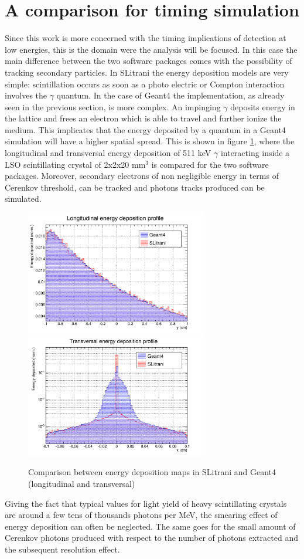 \section{A comparison for timing simulation}
Since this work is more concerned with the timing implications of detection at low energies, this is the domain were the analysis will be focused.
In this case the main difference between the two software packages comes with the possibility of tracking secondary particles.
In SLitrani the energy deposition models are very simple: scintillation occurs as soon as a photo electric or Compton interaction involves the $\gamma$ quantum.
In the case of Geant4 the implementation, as already seen in the previous section, is more complex. An impinging $\gamma$ deposits energy in the lattice and frees an electron which is able to travel and further ionize the medium.
This implicates that the energy deposited by a quantum in a Geant4 simulation will have a higher spatial spread. This is shown in figure \ref{fig:rms}, where the longitudinal and transversal energy deposition of 511 keV $\gamma$ interacting inside a LSO scintillating crystal of 2x2x20 mm$^{3}$ is compared for the two software packages.
Moreover, secondary electrons of non negligible energy in terms of Cerenkov threshold, can be tracked and photons tracks produced can be simulated. 
\begin{figure}[htbp]
\begin{center}
\includegraphics[width=8cm]{../Pictures/Chapter_5/energy_dep.png}
\includegraphics[width=8cm]{../Pictures/Chapter_5/energy_dep_lat.png}
\end{center}
\caption[RMS comparison]{Comparison between energy deposition maps in SLitrani and Geant4 (longitudinal and transversal)}
\label{fig:rms}
\end{figure}
Giving the fact that typical values for light yield of heavy scintillating crystals are around a few tens of thousands photons per MeV, the smearing effect of energy deposition can often be neglected. The same goes for the small amount of Cerenkov photons produced with respect to the number of photons extracted and the subsequent resolution effect.

